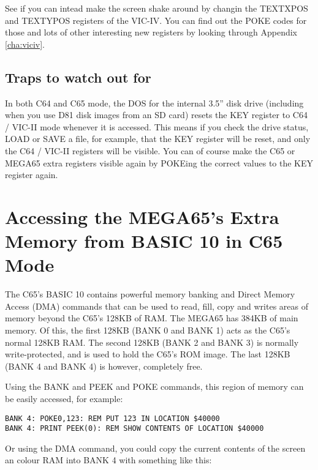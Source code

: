 See if you can intead make the screen shake around by changin the TEXTXPOS and TEXTYPOS registers of
the VIC-IV.  You can find out the POKE codes for those and lots of other interesting new registers
by looking through Appendix \ref{cha:viciv}.

\subsection{Traps to watch out for}

In both C64 and C65 mode, the DOS for the internal 3.5'' disk drive (including when you use D81 disk images from
an SD card) resets the KEY register to C64 / VIC-II mode whenever it is accessed. This means if you check the drive
status, LOAD or SAVE a file, for example, that the KEY register will be reset, and only the C64 / VIC-II registers
will be visible. You can of course make the C65 or MEGA65 extra registers visible again by POKEing the correct values
to the KEY register again.

\section{Accessing the MEGA65's Extra Memory from BASIC 10 in C65 Mode}

The C65's BASIC 10 contains powerful memory banking and Direct Memory Access (DMA) commands that can be used to read,
fill, copy and writes areas of memory beyond the C65's 128KB of RAM.  The MEGA65 has 384KB of main memory. Of this,
the first 128KB (BANK 0 and BANK 1) acts as the C65's normal 128KB RAM. The second 128KB (BANK 2 and BANK 3) is normally
write-protected, and is used to hold the C65's ROM image.  The last 128KB (BANK 4 and BANK 4) is however, completely free.

Using the BANK and PEEK and POKE commands, this region of memory can be easily accessed, for example:

\begin{tcolorbox}[colback=black,coltext=white]
\verbatimfont{\codefont}
\begin{verbatim}
BANK 4: POKE0,123: REM PUT 123 IN LOCATION $40000
BANK 4: PRINT PEEK(0): REM SHOW CONTENTS OF LOCATION $40000
\end{verbatim}
\end{tcolorbox}

Or using the DMA command, you could copy the current contents of the screen an colour RAM into BANK 4 with something like this:

